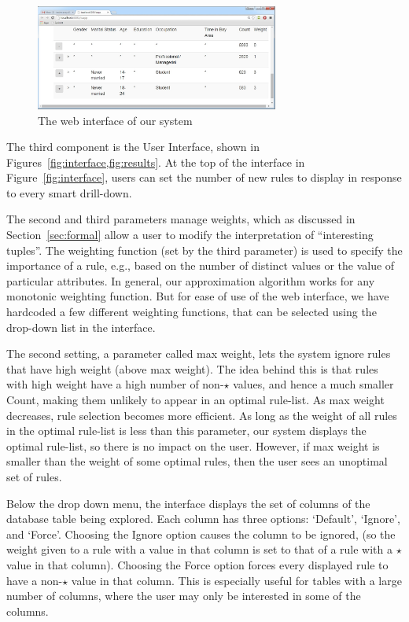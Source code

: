 \begin{figure}[ht]
\vspace{-5pt}
\centering
\includegraphics[width=80mm,frame]{graphs/uiresults.jpg}
\vspace{-5pt}
\caption{The web interface of our system \label{fig:results}}
\vspace{-5pt}
\end{figure}

The third component is the User Interface, shown in Figures~\ref{fig:interface,fig:results}.
At the top of the interface in Figure~\ref{fig:interface}, users can set the number of new rules to display in response to every smart drill-down. 

The second and third parameters manage weights, which as discussed in Section~\ref{sec:formal} allow a user to modify the interpretation of ``interesting tuples''.
The weighting function (set by the third parameter) is used to specify the importance of a rule, e.g., based on the number of distinct values or the value of particular attributes. In general, our approximation algorithm works for any monotonic weighting function. But for ease of use of the web interface, we have hardcoded a few different weighting functions, that can be selected using the drop-down list in the interface.

The second setting, a parameter called max weight, lets the system ignore rules that have high weight (above max weight). The idea behind this is that rules with high weight have a high number of non-$\star$ values, and hence a much smaller Count, making them unlikely to appear in an optimal rule-list. As max weight decreases, rule selection becomes more efficient. As long as the weight of all rules in the optimal rule-list is less than this
parameter, our system displays the optimal rule-list, so there is no impact on the user. However, if max weight is smaller than the weight of some optimal rules, then the user sees an unoptimal set of rules.

Below the drop down menu, the interface displays the set of columns of the database table being explored. Each column has three options: `Default', `Ignore', and `Force'. Choosing the Ignore option causes the column to be ignored, (so the weight given to a rule with a value in that column is set to that of a rule with a $\star$ value in that column). Choosing the Force option forces every displayed rule to have a non-$\star$ value in that column. This is especially useful for tables with a large number of columns, where the user may only be interested in some of the columns. 


